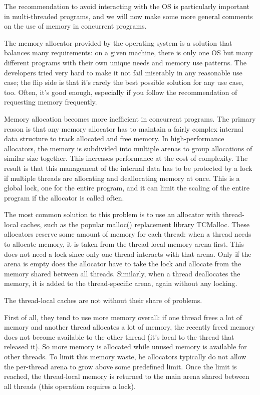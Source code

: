 The recommendation to avoid interacting with the OS is particularly important in multi-threaded programs, and we will now make some more general comments on the use of memory in concurrent programs.


The memory allocator provided by the operating system is a solution that balances many requirements: on a given machine, there is only one OS but many different programs with their own unique needs and memory use patterns. The developers tried very hard to make it not fail miserably in any reasonable use case; the flip side is that it’s rarely the best possible solution for any use case, too. Often, it’s good enough, especially if you follow the recommendation of requesting memory frequently.

Memory allocation becomes more inefficient in concurrent programs. The primary reason is that any memory allocator has to maintain a fairly complex internal data structure to track allocated and free memory. In high-performance allocators, the memory is subdivided into multiple arenas to group allocations of similar size together. This increases performance at the cost of complexity. The result is that this management of the internal data has to be protected by a lock if multiple threads are allocating and deallocating memory at once. This is a global lock, one for the entire program, and it can limit the scaling of the entire program if the allocator is called often.

The most common solution to this problem is to use an allocator with thread-local caches, such as the popular malloc() replacement library TCMalloc. These allocators reserve some amount of memory for each thread: when a thread needs to allocate memory, it is taken from the thread-local memory arena first. This does not need a lock since only one thread interacts with that arena. Only if the arena is empty does the allocator have to take the lock and allocate from the memory shared between all threads. Similarly, when a thread deallocates the memory, it is added to the thread-specific arena, again without any locking.

The thread-local caches are not without their share of problems.

First of all, they tend to use more memory overall: if one thread frees a lot of memory and another thread allocates a lot of memory, the recently freed memory does not become available to the other thread (it’s local to the thread that released it). So more memory is allocated while unused memory is available for other threads. To limit this memory waste, he allocators typically do not allow the per-thread arena to grow above some predefined limit. Once the limit is reached, the thread-local memory is returned to the main arena shared between all threads (this operation requires a lock).

